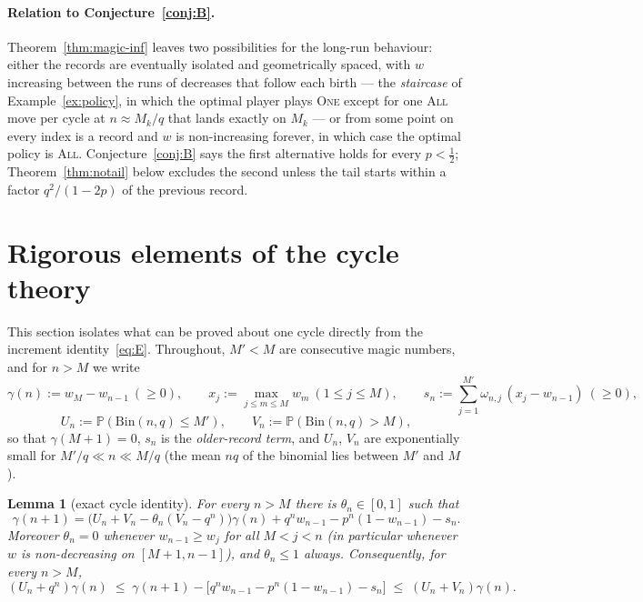 \documentclass[11pt]{article}
\newtheorem{lemma}[theorem]{Lemma}
\theoremstyle{definition}
\newcommand{\One}{\textsc{One}}
\newcommand{\All}{\textsc{All}}
\newcommand{\Bin}{\mathrm{Bin}}
\newcommand{\Prob}{\mathbb{P}}
\begin{document}
\paragraph{Relation to Conjecture~\ref{conj:B}.}  Theorem~\ref{thm:magic-inf}
leaves two possibilities for the long-run behaviour: either the
records are eventually isolated and geometrically spaced, with $w$
increasing between the runs of decreases that follow each birth ---
the \emph{staircase} of Example~\ref{ex:policy}, in which the optimal
player plays \One{} except for one \All{} move per cycle at
$n\approx M_k/q$ that lands exactly on $M_k$ --- or from some point on
every index is a record and $w$ is non-increasing forever, in which
case the optimal policy is \All{}.  Conjecture~\ref{conj:B} says the
first alternative holds for every $p<\tfrac12$; Theorem~\ref{thm:notail}
below excludes the second unless the tail starts within a factor
$q^2/(1-2p)$ of the previous record.

\section{Rigorous elements of the cycle theory}\label{sec:cycle}

This section isolates what can be proved about one cycle directly from
the increment identity~\eqref{eq:E}.  Throughout, $M'<M$ are
consecutive magic numbers, and for $n>M$ we write
\[
  \gamma(n):=w_M-w_{n-1}\ (\ge0),\qquad
  x_j:=\max_{j\le m\le M}w_m\ (1\le j\le M),\qquad
  s_n:=\sum_{j=1}^{M'}\omega_{n,j}\,(x_j-w_{n-1})\ (\ge0),
\]
\[
  U_n:=\Prob(\Bin(n,q)\le M'),\qquad V_n:=\Prob(\Bin(n,q)>M),
\]
so that $\gamma(M+1)=0$, $s_n$ is the \emph{older-record term}, and
$U_n$, $V_n$ are exponentially small for $M'/q\ll n\ll M/q$
(the mean $nq$ of the binomial lies between $M'$ and $M$).

\begin{lemma}[exact cycle identity]\label{lem:cycle}
  For every $n>M$ there is $\theta_n\in[0,1]$ such that
  \begin{equation}\label{eq:cycle}
    \gamma(n+1)=\bigl(U_n+V_n-\theta_n(V_n-q^n)\bigr)\gamma(n)
      +q^nw_{n-1}-p^n(1-w_{n-1})-s_n .
  \end{equation}
  Moreover $\theta_n=0$ whenever $w_{n-1}\ge w_j$ for all $M<j<n$
  (in particular whenever $w$ is non-decreasing on $[M+1,n-1]$), and
  $\theta_n\le1$ always.  Consequently, for every $n>M$,
  \begin{equation}\label{eq:cycle-bounds}
    (U_n+q^n)\gamma(n)\;\le\;
    \gamma(n+1)-\bigl[q^nw_{n-1}-p^n(1-w_{n-1})-s_n\bigr]
    \;\le\;(U_n+V_n)\gamma(n).
  \end{equation}
\end{lemma}
\end{document}
